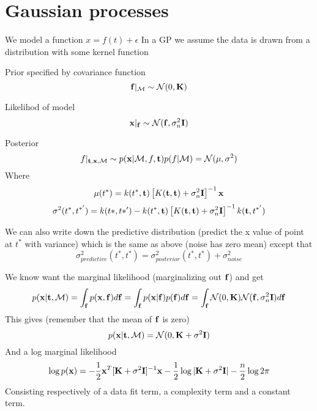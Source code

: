 \section{Gaussian processes}

We model a function $x = f(t) + \epsilon$
In a GP we assume the data is drawn from a distribution with some kernel function

Prior specified by covariance function
\begin{equation}
{\bf f}|_{\mathcal{M}} \sim \mathcal{N}(0, {\bf K})
\end{equation}

Likelihod of model
\begin{equation}
{\bf x}|_{\bf f} \sim \mathcal{N}({\bf f}, \sigma^2_n {\bf I})
\end{equation}

Posterior
\begin{equation}
f|_{{\bf t}, {\bf x}, \mathcal{M}} \sim p({\bf x}|\mathcal{M}, f, {\bf t}) p(f | \mathcal{M}) = \mathcal{N}(\mu, \sigma^2)
\end{equation}
Where
\begin{equation}
\mu(t^*) = k(t^*, {\bf t}) \left [ K({\bf t}, {\bf t}) + \sigma^2_n {\bf I} \right ]^{-1} {\bf x}
\end{equation}
\begin{equation}
\sigma^2(t^*, t^{*'}) = k(t*, t*') - k(t^*, {\bf t}) \left [ K({\bf t}, {\bf t}) + \sigma^2_n {\bf I} \right ]^{-1} k( {\bf t}, t^{*'})
\end{equation}

We can also write down the predictive distribution (predict the x value of point at $t^*$ with variance) which is the same as above (noise has zero mean) except that
\begin{equation}
\sigma_{predictive}^2(t^*, t^*) = \sigma_{posterior}^2(t^*, t^*) + \sigma^2_{noise}
\end{equation}

We know want the marginal likelihood (marginalizing out ${\bf f}$) and get
\begin{equation}
p( {\bf x} | {\bf t}, \mathcal{M} ) = \int_{\bf f}{ p({\bf x}, {\bf f})d{\bf f}} = \int_{\bf f}{ p({\bf x} | {\bf f}) p({\bf f})d{\bf f}}
= \int_{\bf f}{  \mathcal{N}(0, {\bf K})  \mathcal{N}({\bf f}, \sigma^2_n {\bf I}) d{\bf f}}  
\end{equation}
This gives (remember that the mean of $\bf f$ is zero)
\begin{equation}
p( {\bf x} | {\bf t}, \mathcal{M} ) = \mathcal{N}(0, {\bf K} + \sigma^{2} {\bf I} )
\end{equation}
And a log marginal likelihood
\begin{equation}
\log{ p( {\bf x} ) } = -\dfrac{1}{2} {\bf x}^T [ {\bf K} + \sigma^{2} {\bf I} ]^{-1} {\bf x}
- \dfrac{1}{2}\log{|{\bf K} + \sigma^{2} {\bf I}|}
- \dfrac{n}{2} \log{2\pi}
\end{equation}
Consisting respectively of a data fit term, a complexity term and a constant term.

